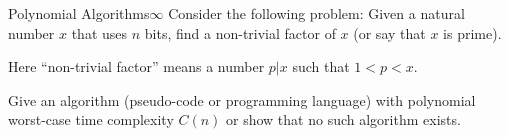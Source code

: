 \documentclass[a4paper]{article}
\begin{document}
\begin{problem}{Polynomial Algorithms}{$\infty$}
Consider the following problem: Given a natural number $x$ that uses $n$ bits, find a non-trivial factor of $x$ (or say that $x$ is prime).

Here ``non-trivial factor'' means a number $p|x$ such that $1<p<x$.

Give an algorithm (pseudo-code or programming language) with polynomial worst-case time complexity $C(n)$ or show that no such algorithm exists.
\end{problem}
\end{document}
